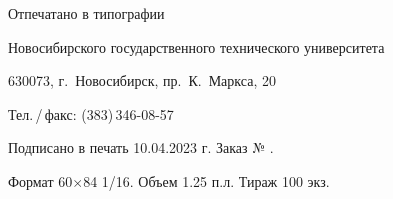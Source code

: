 
\thispagestyle{empty}
\vspace*{0pt plus1fill}
\begin{center}
    Отпечатано в типографии \par
    Новосибирского государственного технического университета \par   
    630073, г.~Новосибирск, пр.~К.~Маркса, 20 \par
    Тел.\,/\,факс: (383)\,346-08-57 \par
    Подписано в печать 10.04.2023 г. Заказ № . \par
    Формат 60$\times$84 1/16. Объем 1.25 п.л. Тираж 100 экз.
\end{center}